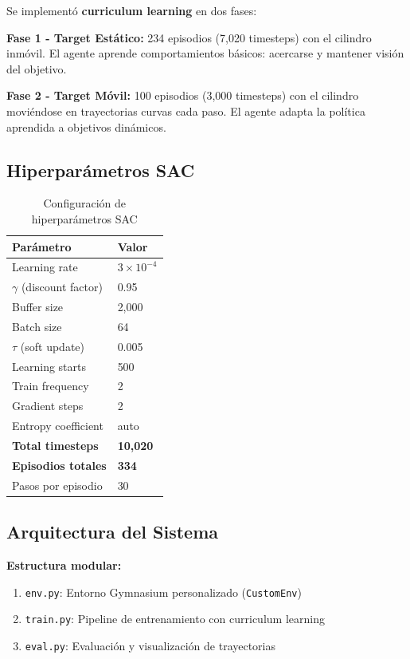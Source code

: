 \documentclass[12pt,a4paper]{article}
\begin{document}
Se implementó \textbf{curriculum learning} en dos fases:

\textbf{Fase 1 - Target Estático:} 234 episodios (7,020 timesteps) con el cilindro inmóvil. El agente aprende comportamientos básicos: acercarse y mantener visión del objetivo.

\textbf{Fase 2 - Target Móvil:} 100 episodios (3,000 timesteps) con el cilindro moviéndose en trayectorias curvas cada paso. El agente adapta la política aprendida a objetivos dinámicos.

\subsection{Hiperparámetros SAC}

\begin{table}[H]
\centering
\begin{tabular}{@{}ll@{}}
\toprule
\textbf{Parámetro} & \textbf{Valor} \\ \midrule
Learning rate & $3 \times 10^{-4}$ \\
$\gamma$ (discount factor) & 0.95 \\
Buffer size & 2,000 \\
Batch size & 64 \\
$\tau$ (soft update) & 0.005 \\
Learning starts & 500 \\
Train frequency & 2 \\
Gradient steps & 2 \\
Entropy coefficient & auto \\
\textbf{Total timesteps} & \textbf{10,020} \\
\textbf{Episodios totales} & \textbf{334} \\
Pasos por episodio & 30 \\ \bottomrule
\end{tabular}
\caption{Configuración de hiperparámetros SAC}
\end{table}

\subsection{Arquitectura del Sistema}

\textbf{Estructura modular:}
\begin{enumerate}
    \item \texttt{env.py}: Entorno Gymnasium personalizado (\texttt{CustomEnv})
    \item \texttt{train.py}: Pipeline de entrenamiento con curriculum learning
    \item \texttt{eval.py}: Evaluación y visualización de trayectorias
\end{enumerate}
\end{document}
